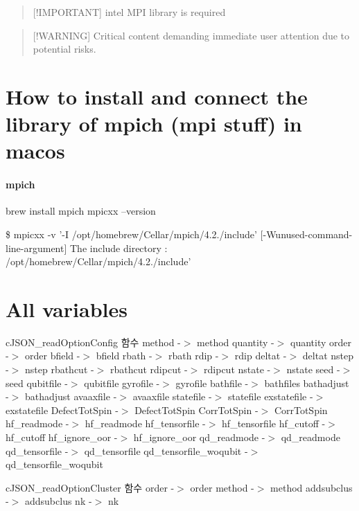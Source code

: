 \begin{quotation}
\mbox{[}!\-I\-M\-P\-O\-R\-T\-A\-N\-T\mbox{]} intel M\-P\-I library is required

\end{quotation}


\begin{quotation}
\mbox{[}!\-W\-A\-R\-N\-I\-N\-G\mbox{]} Critical content demanding immediate user attention due to potential risks.

\end{quotation}


\section*{How to install and connect the library of mpich (mpi stuff) in macos}

\paragraph*{mpich}

brew install mpich mpicxx --version

\$ mpicxx -\/v '-\/\-I /opt/homebrew/\-Cellar/mpich/4.2./include' \mbox{[}-\/\-Wunused-\/command-\/line-\/argument\mbox{]} The include directory \-: /opt/homebrew/\-Cellar/mpich/4.2./include'

\section*{All variables}

c\-J\-S\-O\-N\-\_\-read\-Option\-Config 함수 method -\/$>$ method quantity -\/$>$ quantity order -\/$>$ order bfield -\/$>$ bfield rbath -\/$>$ rbath rdip -\/$>$ rdip deltat -\/$>$ deltat nstep -\/$>$ nstep rbathcut -\/$>$ rbathcut rdipcut -\/$>$ rdipcut nstate -\/$>$ nstate seed -\/$>$ seed qubitfile -\/$>$ qubitfile gyrofile -\/$>$ gyrofile bathfile -\/$>$ bathfiles bathadjust -\/$>$ bathadjust avaaxfile -\/$>$ avaaxfile statefile -\/$>$ statefile exstatefile -\/$>$ exstatefile Defect\-Tot\-Spin -\/$>$ Defect\-Tot\-Spin Corr\-Tot\-Spin -\/$>$ Corr\-Tot\-Spin hf\-\_\-readmode -\/$>$ hf\-\_\-readmode hf\-\_\-tensorfile -\/$>$ hf\-\_\-tensorfile hf\-\_\-cutoff -\/$>$ hf\-\_\-cutoff hf\-\_\-ignore\-\_\-oor -\/$>$ hf\-\_\-ignore\-\_\-oor qd\-\_\-readmode -\/$>$ qd\-\_\-readmode qd\-\_\-tensorfile -\/$>$ qd\-\_\-tensorfile qd\-\_\-tensorfile\-\_\-woqubit -\/$>$ qd\-\_\-tensorfile\-\_\-woqubit

c\-J\-S\-O\-N\-\_\-read\-Option\-Cluster 함수 order -\/$>$ order method -\/$>$ method addsubclus -\/$>$ addsubclus nk -\/$>$ nk

